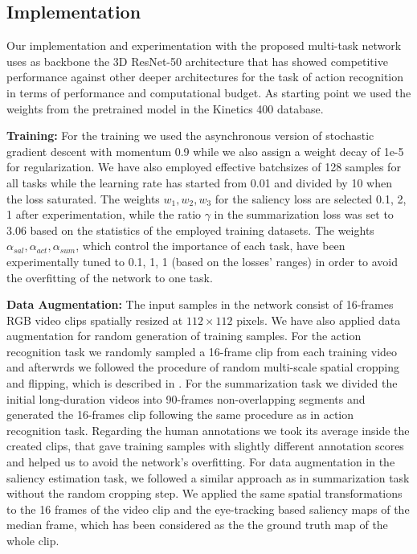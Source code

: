 \documentclass[10pt,twocolumn,letterpaper]{article}
\begin{document}
\subsection{Implementation}

Our implementation and experimentation with the proposed multi-task network uses as backbone the 3D ResNet-50 architecture \cite{hara2018can} that has showed competitive performance against other deeper architectures for the task of action recognition in terms of performance and computational budget. As starting point we used the weights from the pretrained model in the Kinetics 400 database. 

\noindent \textbf{Training:} For the training we used the asynchronous version of stochastic gradient descent with momentum 0.9 while we also assign a weight decay of 1e-5 for regularization. We have also employed effective batchsizes of 128 samples for all tasks while the learning rate has started from 0.01 and divided by 10 when the loss saturated. 
The weights $w_1, w_2, w_3$ for the saliency loss are selected 0.1, 2, 1 after experimentation, while the ratio $\gamma$ in the summarization loss was set to 3.06 based on the statistics of the employed training datasets. The weights $\alpha_{sal},\alpha_{act},\alpha_{sum}$, which control the importance of each task, have been experimentally tuned to 0.1, 1, 1 (based on the losses' ranges) in order to avoid the overfitting of the network to one task.

\noindent \textbf{Data Augmentation:} The input samples in the network consist of 16-frames RGB video clips spatially resized at $112 \times 112$ pixels. We have also applied data augmentation for random generation of training samples. For the action recognition task we randomly sampled a 16-frame clip from each training video and afterwrds we followed the procedure of random multi-scale spatial cropping and flipping, which is described in \cite{wang2016temporal}. For the summarization task we divided the initial long-duration videos into 90-frames non-overlapping segments and generated the 16-frames clip following the same procedure as in action recognition task. Regarding the human annotations we took its average inside the created clips, that gave training samples with slightly different annotation scores and helped us to avoid the network's overfitting.    For data augmentation in the saliency estimation task, we followed a similar approach as in summarization task without the random cropping step. We applied the same spatial transformations to the 16 frames of the video clip and the eye-tracking based saliency maps of the median frame, which has been considered as the the ground truth map of the whole clip.
\end{document}
